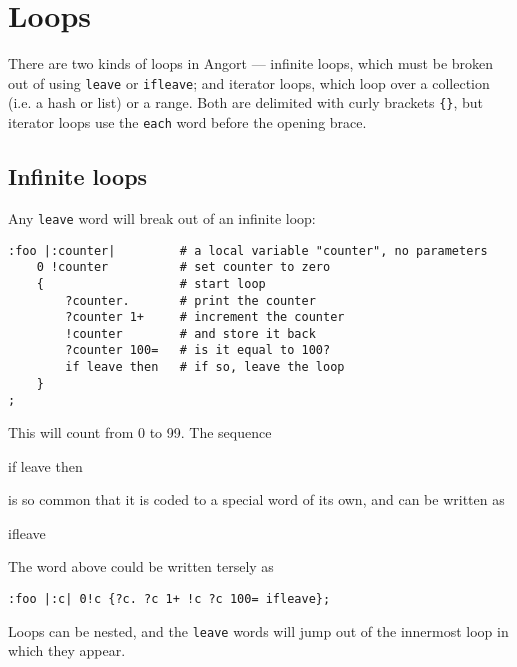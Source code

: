 \section{Loops}
There are two kinds of loops in Angort --- infinite loops,
which must be broken out of using \texttt{leave} or \texttt{ifleave}; and
iterator loops, which loop over a collection (i.e. a hash or list) or
a range. Both are delimited with curly brackets \verb+{}+, but iterator loops
use the \texttt{each} word before the opening brace.

\subsection{Infinite loops}
Any \texttt{leave} word will break out of an infinite loop:
\begin{lstlisting}
:foo |:counter|         # a local variable "counter", no parameters
    0 !counter          # set counter to zero
    {                   # start loop
        ?counter.       # print the counter
        ?counter 1+     # increment the counter
        !counter        # and store it back
        ?counter 100=   # is it equal to 100?
        if leave then   # if so, leave the loop
    }
;
\end{lstlisting}
This will count from 0 to 99. The sequence
\begin{v}
if leave then
\end{v}
is so common that it is coded to a special word of its own, and can be written
as 
\begin{v}
ifleave
\end{v}
The word above could be written tersely as
\begin{lstlisting}
:foo |:c| 0!c {?c. ?c 1+ !c ?c 100= ifleave};
\end{lstlisting}
Loops can be nested, and the \texttt{leave} words will jump out of the
innermost loop in which they appear.

